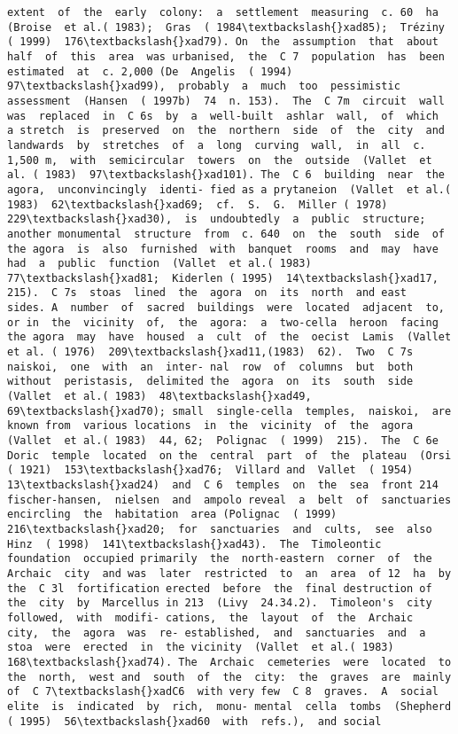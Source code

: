 \documentclass[11pt]{article}
\begin{document}
\begin{Verbatim}[commandchars=\\\{\}]
extent  of  the  early  colony:  a  settlement  measuring  c. 60  ha (Broise  et al.( 1983);  Gras  ( 1984\textbackslash{}xad85);  Tréziny  ( 1999)  176\textbackslash{}xad79). On  the  assumption  that  about  half  of  this  area  was urbanised,  the  C 7  population  has  been  estimated  at  c. 2,000 (De  Angelis  ( 1994)  97\textbackslash{}xad99),  probably  a  much  too  pessimistic assessment  (Hansen  ( 1997b)  74  n. 153).  The  C 7m  circuit  wall was  replaced  in  C 6s  by  a  well-built  ashlar  wall,  of  which  a stretch  is  preserved  on  the  northern  side  of  the  city  and landwards  by  stretches  of  a  long  curving  wall,  in  all  c. 1,500 m,  with  semicircular  towers  on  the  outside  (Vallet  et al. ( 1983)  97\textbackslash{}xad101). The  C 6  building  near  the  agora,  unconvincingly  identi- fied as a prytaneion  (Vallet  et al.( 1983)  62\textbackslash{}xad69;  cf.  S.  G.  Miller ( 1978)  229\textbackslash{}xad30),  is  undoubtedly  a  public  structure;  another monumental  structure  from  c. 640  on  the  south  side  of  the agora  is  also  furnished  with  banquet  rooms  and  may  have had  a  public  function  (Vallet  et al.( 1983)  77\textbackslash{}xad81;  Kiderlen ( 1995)  14\textbackslash{}xad17,  215).  C 7s  stoas  lined  the  agora  on  its  north  and east  sides. A  number  of  sacred  buildings  were  located  adjacent  to,  or in  the  vicinity  of,  the  agora:  a  two-cella  heroon  facing  the agora  may  have  housed  a  cult  of  the  oecist  Lamis  (Vallet  et al. ( 1976)  209\textbackslash{}xad11,(1983)  62).  Two  C 7s  naiskoi,  one  with  an  inter- nal  row  of  columns  but  both  without  peristasis,  delimited the  agora  on  its  south  side  (Vallet  et al.( 1983)  48\textbackslash{}xad49,  69\textbackslash{}xad70); small  single-cella  temples,  naiskoi,  are known from  various locations  in  the  vicinity  of  the  agora  (Vallet  et al.( 1983)  44, 62;  Polignac  ( 1999)  215).  The  C 6e  Doric  temple  located  on the  central  part  of  the  plateau  (Orsi  ( 1921)  153\textbackslash{}xad76;  Villard and  Vallet  ( 1954)  13\textbackslash{}xad24)  and  C 6  temples  on  the  sea  front 214 fischer-hansen,  nielsen  and  ampolo reveal  a  belt  of  sanctuaries  encircling  the  habitation  area (Polignac  ( 1999)  216\textbackslash{}xad20;  for  sanctuaries  and  cults,  see  also Hinz  ( 1998)  141\textbackslash{}xad43).  The  Timoleontic  foundation  occupied primarily  the  north-eastern  corner  of  the  Archaic  city  and was  later  restricted  to  an  area  of 12  ha  by  the  C 3l  fortification erected  before  the  final destruction of  the  city  by  Marcellus in 213  (Livy  24.34.2).  Timoleon's  city  followed,  with  modifi- cations,  the  layout  of  the  Archaic  city,  the  agora  was  re- established,  and  sanctuaries  and  a  stoa  were  erected  in  the vicinity  (Vallet  et al.( 1983)  168\textbackslash{}xad74). The  Archaic  cemeteries  were  located  to  the  north,  west and  south  of  the  city:  the  graves  are  mainly  of  C 7\textbackslash{}xadC6  with very few  C 8  graves.  A  social  elite  is  indicated  by  rich,  monu- mental  cella  tombs  (Shepherd  ( 1995)  56\textbackslash{}xad60  with  refs.),  and social  
\end{Verbatim}
\end{document}
